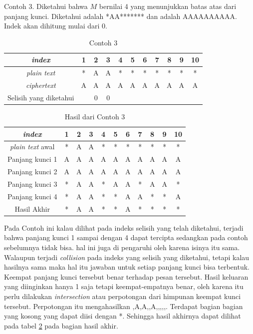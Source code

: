 	
	Contoh 3. Diketahui bahwa $M$ bernilai 4 yang menunjukkan batas atas dari panjang kunci. Diketahui \plaintext adalah *AA******* dan \ciphertext adalah AAAAAAAAAA. Indek akan dihitung mulai dari 0.
	 \begin{table}[H]
	 	\centering
	 	\begin{tabular}{|c|c|c|c|c|c|c|c|c|c|c|}\hline
	 	\textit{index}&1&2&3&4&5&6&7&8&9&10\\ \hline
	 	\textit{plain text}&*&A&A&*&*&*&*&*&*&*\\ \hline
	 	\textit{ciphertext}&A&A&A&A&A&A&A&A&A&A\\ \hline
		Selisih yang diketahui & &0&0& & & & & & & \\ \hline	 	
	 	\end{tabular}
	 	\caption{Contoh 3}
	 	\label{tab:contoh3}
	\end{table}
	
	\begin{table}[H]
		\centering
		\begin{tabular}{|c|c|c|c|c|c|c|c|c|c|c|}\hline
		\textit{index}&1&2&3&4&5&6&7&8&9&10\\ \hline		
		\textit{plain text} awal&*&A&A&*&*&*&*&*&*&*\\ \hline
		Panjang kunci 1 &A&A&A&A&A&A&A&A&A&A\\ \hline
		Panjang kunci 2 &A&A&A&A&A&A&A&A&A&A\\ \hline
		Panjang kunci 3 &*&A&A&*&A&A&*&A&A&*\\ \hline
		Panjang kunci 4 &*&A&A&*&*&A&A&*&*&A\\ \hline
		Hasil Akhir     &*&A&A&*&*&A&*&*&*&*\\ \hline
		\end{tabular}
		\caption{Hasil dari Contoh 3}
		\label{tab:res_contoh_3}
	\end{table}
	Pada Contoh ini kalau dilihat pada indeks selisih yang telah diketahui, terjadi bahwa panjang kunci 1 sampai dengan 4 dapat tercipta sedangkan pada contoh sebelumnya tidak bisa. hal ini juga di pengaruhi oleh karena isinya itu sama. Walaupun terjadi \textit{collision} pada indeks yang selisih yang diketahui, tetapi kalau hasilnya sama maka hal itu jawaban untuk setiap panjang kunci bisa terbentuk. Keempat panjang kunci tersebut benar terhadap pesan tersebut. Hasil keluaran yang diinginkan hanya 1 saja tetapi keempat-empatnya benar, oleh karena itu perlu dilakukan \textit{intersection} atau perpotongan dari himpunan keempat kunci tersebut. Perpotongan itu mengahasilkan {,A,A,,A,,,,,}. Terdapat bagian bagian yang kosong yang dapat  diisi dengan *. Sehingga hasil akhirnya dapat dilihat pada tabel \ref{tab:res_contoh_3} pada bagian hasil akhir.
	
